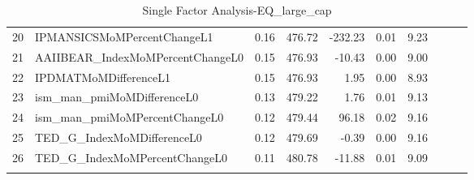 \begin{longtable}{rlrrrrrlll}
  20 & IPMANSICSMoMPercentChangeL1 & 0.16 & 476.72 & -232.23 & 0.01 & 9.23 &  &  &  \\ 
  21 & AAIIBEAR\_IndexMoMPercentChangeL0 & 0.15 & 476.93 & -10.43 & 0.00 & 9.00 &  &  &  \\ 
  22 & IPDMATMoMDifferenceL1 & 0.15 & 476.93 & 1.95 & 0.00 & 8.93 &  &  &  \\ 
  23 & ism\_man\_pmiMoMDifferenceL0 & 0.13 & 479.22 & 1.76 & 0.01 & 9.13 &  &  &  \\ 
  24 & ism\_man\_pmiMoMPercentChangeL0 & 0.12 & 479.44 & 96.18 & 0.02 & 9.16 &  &  &  \\ 
  25 & TED\_G\_IndexMoMDifferenceL0 & 0.12 & 479.69 & -0.39 & 0.00 & 9.16 &  &  &  \\ 
  26 & TED\_G\_IndexMoMPercentChangeL0 & 0.11 & 480.78 & -11.88 & 0.01 & 9.09 &  &  &  \\ 
   \hline
\hline
\caption{Single Factor Analysis-EQ_large_cap} 
\end{longtable}

